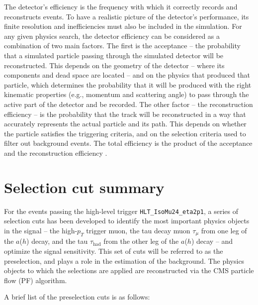 The detector's efficiency is the frequency with which it correctly records and reconstructs events. To have a realistic picture of the detector's performance, its finite resolution and inefficiencies must also be included in the simulation. For any given physics search, the detector efficiency can be considered as a combination of two main factors. The first is the acceptance -- the probability that a simulated particle passing through the simulated detector will be reconstructed. This depends on the geometry of the detector -- where its components and dead space are located -- and on the physics that produced that particle, which determines the probability that it will be produced with the right kinematic properties (e.g., momentum and scattering angle) to pass through the active part of the detector and be recorded. The other factor -- the reconstruction efficiency -- is the probability that the track will be reconstructed in a way that accurately represents the actual particle and its path. This depends on whether the particle satisfies the triggering criteria, and on the selection criteria used to filter out background events. The total efficiency is the product of the acceptance and the reconstruction efficiency \cite{CMS:2010mua}\cite{Chatrchyan:2012rga}.

\section{Selection cut summary\label{evtsel-strategy}}
For the events passing the high-level trigger \texttt{HLT\_IsoMu24\_eta2p1}, a series of selection cuts has been developed to identify the most important physics objects in the signal -- the high-$p_T$ trigger muon, the tau decay muon $\tau_{\mu}$ from one leg of the $a$($h$) decay, and the tau $\tau_{\text{had}}$ from the other leg of the $a$($h$) decay -- and optimize the signal sensitivity. This set of cuts will be referred to as the preselection, and plays a role in the estimation of the background. The physics objects to which the selections are applied are reconstructed via the CMS particle flow (PF) algorithm.

A brief list of the preselection cuts is as follows:

